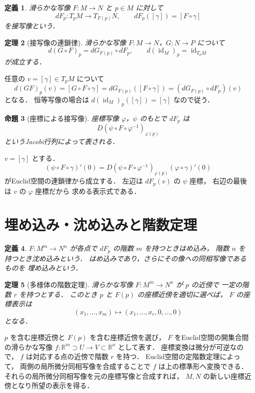 \documentclass[a5paper,10pt,onecolumn]{jsarticle}
\makeatletter
\theoremstyle{mathnotetheorem}
\newtheorem{theorem}{定理}[section]
\newtheorem{definition}[theorem]{定義}
\newtheorem{proposition}[theorem]{命題}
\renewcommand{\proofname}{証明}
\renewenvironment{proof}[1][\proofname]{%
  \par\pushQED{\qed}\normalfont\topsep4\p@\@plus2\p@\relax
  \trivlist\item[\hskip\labelsep\bfseries #1]\ignorespaces
}{\popQED\endtrivlist\@endpefalse}
\makeatother
\begin{document}
\begin{definition}
滑らかな写像 $F:M\to N$ と $p\in M$ に対して
\[
 dF_p:T_pM\to T_{F(p)}N,\qquad
 dF_p([\gamma])=[F\circ\gamma]
\]
を接写像という．
\end{definition}

\begin{theorem}[接写像の連鎖律]\label{thm:chain}
滑らかな写像 $F:M\to N$，$G:N\to P$ について
\[
 d(G\circ F)_p=dG_{F(p)}\circ dF_p,\qquad
 d(\operatorname{id}_M)_p=\operatorname{id}_{T_pM}
\]
が成立する．
\end{theorem}
\begin{proof}
任意の $v=[\gamma]\in T_pM$ について
\[
 d(GF)_p(v)=[G\circ F\circ\gamma]
 =dG_{F(p)}([F\circ\gamma])
 =(dG_{F(p)}\circ dF_p)(v)
\]
となる．
恒等写像の場合は
$d(\operatorname{id}_M)_p([\gamma])=[\gamma]$
なので従う．
\end{proof}

\begin{proposition}[座標による接写像]\label{prop:jacobian}
座標写像 $\varphi$，$\psi$ のもとで
$dF_p$ は
\[
 D(\psi\circ F\circ\varphi^{-1})_{\varphi(p)}
\]
というJacobi行列によって表される．
\end{proposition}
\begin{proof}
$v=[\gamma]$ とする．
\[
 (\psi\circ F\circ\gamma)'(0)
 =D(\psi\circ F\circ\varphi^{-1})_{\varphi(p)}
  (\varphi\circ\gamma)'(0)
\]
がEuclid空間の連鎖律から成立する．
左辺は $dF_p(v)$ の $\psi$ 座標，
右辺の最後は $v$ の $\varphi$ 座標だから
求める表示式である．
\end{proof}

\section{埋め込み・沈め込みと階数定理}

\begin{definition}
$F:M^m\to N^n$ が各点で
$dF_p$ の階数 $m$ を持つとき\emph{はめ込み}，
階数 $n$ を持つとき\emph{沈め込み}という．
はめ込みであり，さらにその像への同相写像であるものを
\emph{埋め込み}という．
\end{definition}

\begin{theorem}[多様体の階数定理]\label{thm:rank}
滑らかな写像 $F:M^m\to N^n$ が $p$ の近傍で
一定の階数 $r$ を持つとする．
このとき $p$ と $F(p)$ の座標近傍を適切に選べば，
$F$ の座標表示は
\[
 (x_1,\dots,x_m)\longmapsto
 (x_1,\dots,x_r,0,\dots,0)
\]
となる．
\end{theorem}
\begin{proof}
$p$ を含む座標近傍と $F(p)$ を含む座標近傍を選び，
$F$ をEuclid空間の開集合間の滑らかな写像
$f:\mathbb R^m\supset U\to V\subset\mathbb R^n$ として表す．
座標変換は微分が可逆なので，
$f$ は対応する点の近傍で階数 $r$ を持つ．
Euclid空間の定階数定理によって，
両側の局所微分同相写像を合成することで
$f$ は上の標準形へ変換できる．
それらの局所微分同相写像を元の座標写像と合成すれば，
$M,N$ の新しい座標近傍となり所望の表示を得る．
\end{proof}
\end{document}
